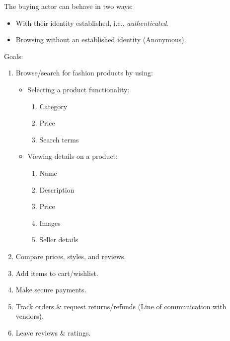 \documentclass[a4paper,10pt]{article}
\begin{document}
The buying actor can behave in two ways:

\begin{itemize}
    \item With their identity established, i.e., \emph{authenticated}.
    \item Browsing without an established identity (Anonymous).
\end{itemize}


Goals:

\begin{enumerate}
    \item Browse/search for fashion products by using:
          \begin{itemize}
              \item Selecting a product functionality:
                    \begin{enumerate}
                        \item Category
                        \item Price
                        \item Search terms
                    \end{enumerate}
              \item Viewing details on a product:
                    \begin{enumerate}
                        \item Name
                        \item Description
                        \item Price
                        \item Images
                        \item Seller details
                    \end{enumerate}
          \end{itemize}


    \item Compare prices, styles, and reviews.

    \item Add items to cart/wishlist.

    \item Make secure payments.

    \item Track orders \& request returns/refunds (Line of communication with vendors).

    \item Leave reviews \& ratings.
\end{enumerate}
\end{document}
